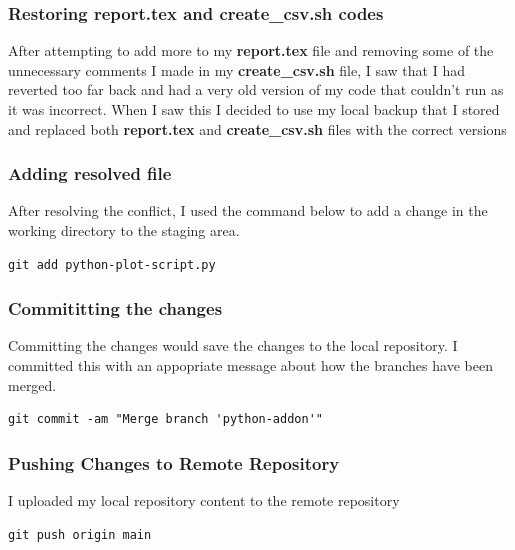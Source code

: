 \documentclass[]{article}
\begin{document}
\subsubsection{Restoring report.tex and create\_csv.sh codes}
After attempting to add more to my \textbf{report.tex} file and removing some of the unnecessary comments I made in
my \textbf{create\_csv.sh} file, I saw that I had reverted too far back and had a very old version of my code that
couldn't run as it was incorrect. When I saw this I decided to use my local backup that I stored and replaced both
\textbf{report.tex} and \textbf{create\_csv.sh} files with the correct versions

\subsubsection{Adding resolved file}
After resolving the conflict, I used the command below to add a change in the working directory to the staging area.
\begin{tcolorbox}[colback=white, colframe=black, boxrule=1pt,
    fonttitle=\bfseries, listing only, listing options={language=sh, basicstyle=\ttfamily}]
\begin{verbatim}
git add python-plot-script.py
\end{verbatim}
\end{tcolorbox}

\clearpage

\subsubsection{Commititting the changes}
Committing the changes would save the changes to the local repository. I committed this with an appopriate message about how the
branches have been merged.
\begin{tcolorbox}[colback=white, colframe=black, boxrule=1pt, 
    fonttitle=\bfseries, listing only, listing options={language=sh, basicstyle=\ttfamily}]
\begin{verbatim}
git commit -am "Merge branch 'python-addon'"
\end{verbatim}
\end{tcolorbox}

\subsubsection{Pushing Changes to Remote Repository}
I uploaded my local repository content to the remote repository 
\begin{tcolorbox}[colback=white, colframe=black, boxrule=1pt,
    fonttitle=\bfseries, listing only, listing options={language=sh, basicstyle=\ttfamily}]
\begin{verbatim}
git push origin main
\end{verbatim}
\end{tcolorbox}
\end{document}

